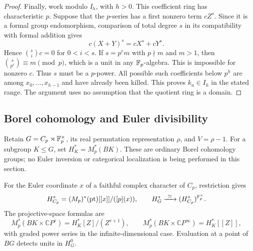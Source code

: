 \begin{proof}
 Finally, work modulo $I_h$, with $h>0$.  This coefficient ring has
 characteristic $p$.  Suppose that the $p$-series has a first nonzero
 term $cZ^s$.  Since it is a formal group endomorphism, comparison of
 total degree $s$ in its compatibility with formal addition gives
 \[
  c(X+Y)^s=cX^s+cY^s.
 \]
 Hence $\binom{s}{i}c=0$ for $0<i<s$.  If $s=p^rm$ with
 $p\nmid m$ and $m>1$, then
 $\binom{s}{p^r}\equiv m\pmod p$, which is a unit in any
 $\mathbb F_p$-algebra.  This is impossible for nonzero $c$.
 Thus $s$ must be a $p$-power.  All possible such coefficients below
 $p^h$ are among $x_0,\ldots,x_{h-1}$ and have already been killed.
 This proves $k_u\in I_h$ in the stated range.  The argument uses no
 assumption that the quotient ring is a domain.
\end{proof}

\subsection{Borel cohomology and Euler divisibility}

Retain $G=C_p\rtimes\mathbb F_p^\times$, its real permutation representation
$\rho$, and $V=\rho-1$.  For a subgroup $K\leq G$, set
$H_K^*=M_p^*(BK)$.  These are ordinary Borel cohomology groups; no
Euler inversion or categorical localization is being performed in this
section.

\begin{lemma}
 \label{cob:cohomology}
 For the Euler coordinate $x$ of a faithful complex character of $C_p$,
 restriction gives
 \begin{equation}
  \label{cob:borel-rings}
  H_{C_p}^*=(M_p)^*(\mathrm{pt})[[x]]/([p](x)),
  \qquad
  H_G^*\xrightarrow{\ \simeq\ }
     (H_{C_p}^*)^{\mathbb F_p^\times}.
 \end{equation}
 The projective-space formulas are
 \[
  M_p^*(BK\times\mathbb CP^r)=H_K^*[Z]/(Z^{r+1}),
  \qquad
  M_p^*(BK\times\mathbb CP^\infty)=H_K^*[[Z]],
 \]
 with graded power series in the infinite-dimensional case.
 Evaluation at a point of $BG$ detects units in $H_G^0$.
\end{lemma}

